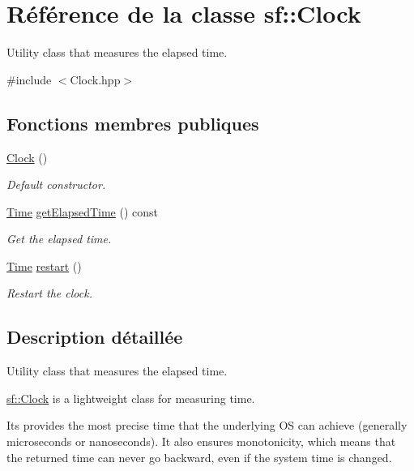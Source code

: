 \hypertarget{classsf_1_1Clock}{}\section{Référence de la classe sf\+:\+:Clock}
\label{classsf_1_1Clock}


Utility class that measures the elapsed time.  




{\ttfamily \#include $<$Clock.\+hpp$>$}

\subsection*{Fonctions membres publiques}
\begin{DoxyCompactItemize}
\item 
\hyperlink{classsf_1_1Clock_abbc959c7830ca7c3a4da133cb506d3fd}{Clock} ()
\begin{DoxyCompactList}\small\item\em Default constructor. \end{DoxyCompactList}\item 
\hyperlink{classsf_1_1Time}{Time} \hyperlink{classsf_1_1Clock_abe889b42a65bcd8eefc16419645d08a7}{get\+Elapsed\+Time} () const
\begin{DoxyCompactList}\small\item\em Get the elapsed time. \end{DoxyCompactList}\item 
\hyperlink{classsf_1_1Time}{Time} \hyperlink{classsf_1_1Clock_a123e2627f2943e5ecaa1db0c7df3231b}{restart} ()
\begin{DoxyCompactList}\small\item\em Restart the clock. \end{DoxyCompactList}\end{DoxyCompactItemize}


\subsection{Description détaillée}
Utility class that measures the elapsed time. 

\hyperlink{classsf_1_1Clock}{sf\+::\+Clock} is a lightweight class for measuring time.

Its provides the most precise time that the underlying OS can achieve (generally microseconds or nanoseconds). It also ensures monotonicity, which means that the returned time can never go backward, even if the system time is changed.

